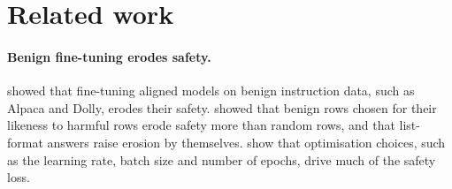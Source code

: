 \documentclass{article}
\begin{document}
\section{Related work}
\label{sec:related}

\paragraph{Benign fine-tuning erodes safety.} \citet{qi2024finetuning} showed
that fine-tuning aligned models on benign instruction data, such as Alpaca and
Dolly, erodes their safety. \citet{he2024safe} showed that benign rows chosen
for their likeness to harmful rows erode safety more than random rows, and that
list-format answers raise erosion by themselves.
\citet{kim2025rethinking} show that optimisation choices, such as the learning
rate, batch size and number of epochs, drive much of the safety loss.
\end{document}
